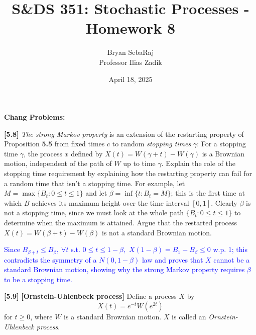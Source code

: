 \documentclass{article}
\title{S\&DS 351: Stochastic Processes - Homework 8}
\author{Bryan SebaRaj \\[0.8em] Professor Ilias Zadik}
\date{April 18, 2025}
\begin{document}
\maketitle

\textbf{Chang Problems:}

\textbf{[5.8]} \textit{The strong Markov property} is an extension of
the restarting property of Proposition \textbf{5.5} from fixed times
$c$ to random \textit{stopping times} $\gamma$: For a stopping time
$\gamma$, the process $x$ defined by $X(t) = W(\gamma + t) -
W(\gamma)$ is a Brownian motion, independent of the path of $W$ up to
time $\gamma$. Explain the role of the stopping time requirement by
explaining how the restarting property can fail for a random time
that isn’t a stopping time. For example, let $M = \max\{B_t : 0 \leq
t \leq 1\}$ and let $\beta = \inf\{t : B_t = M\}$; this is the first
time at which $B$ achieves its maximum height over the time interval
$[0,1]$. Clearly $\beta$ is not a stopping time, since we must look
at the whole path $\{B_t : 0 \leq t \leq 1\}$ to determine when the
maximum is attained. Argue that the restarted process $X(t) = W(\beta
+ t) - W(\beta)$ is not a standard Brownian motion.


\textcolor{blue}{ Since $B_{\beta+t}\le B_\beta, \ \forall t$ s.t. $0\le
    t\le 1-\beta,$ $X(1-\beta)=B_1-B_\beta\le 0$ w.p. 1; this contradicts 
    the symmetry of a $N(0,1-\beta)$ law and
    proves that $X$ cannot be a standard Brownian motion,
    showing why the strong Markov property requires $\beta$ to be
    a stopping time. }

\textbf{[5.9]} \textbf{[Ornstein-Uhlenbeck process]} Define a process $X$ by
\[
X(t) = e^{-t}W(e^{2t})
\]
for $t \geq 0$, where $W$ is a standard Brownian motion. $X$ is called an \textit{Ornstein-Uhlenbeck process}.
\end{document}
